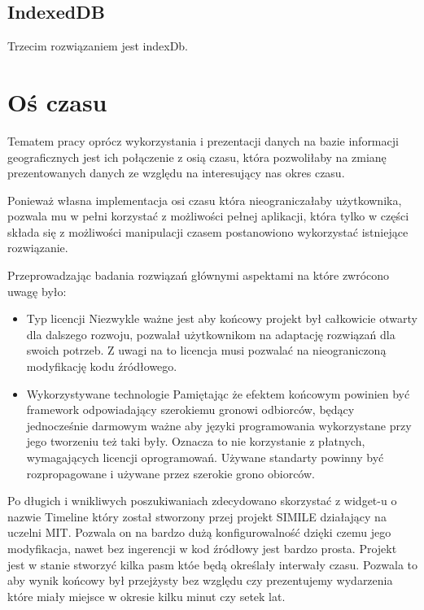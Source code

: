 \subsection{IndexedDB}
\label{subsec:indexDB}

Trzecim rozwiązaniem jest indexDb.

\section{Oś czasu}
\label{sec:timeLine}

Tematem pracy oprócz wykorzystania i prezentacji danych na bazie informacji geograficznych jest ich połączenie z osią czasu, która pozwoliłaby na zmianę prezentowanych danych ze względu na interesujący nas okres czasu.

Ponieważ własna implementacja osi czasu która nieograniczałaby użytkownika, pozwala mu w pełni korzystać z możliwości pełnej aplikacji, która tylko w części składa się z możliwości manipulacji czasem postanowiono wykorzystać istniejące rozwiązanie.

Przeprowadzając badania rozwiązań głównymi aspektami na które zwrócono uwagę było:

\begin{itemize}

\item

Typ licencji
Niezwykle ważne jest aby końcowy projekt był całkowicie otwarty dla dalszego rozwoju, pozwalał użytkownikom na adaptację rozwiązań dla swoich potrzeb. Z uwagi na to licencja musi pozwalać na nieograniczoną modyfikację kodu źródłowego.

\item

Wykorzystywane technologie
Pamiętając że efektem końcowym powinien być framework odpowiadający szerokiemu gronowi odbiorców, będący jednocześnie darmowym ważne aby języki programowania wykorzystane przy jego tworzeniu też taki były. Oznacza to nie korzystanie z płatnych, wymagających licencji oprogramowań. Używane standarty powinny być rozpropagowane i używane przez szerokie grono obiorców.

\end{itemize}

Po długich i wnikliwych poszukiwaniach zdecydowano skorzystać z widget-u o nazwie Timeline który został stworzony przej projekt SIMILE działający na uczelni MIT. Pozwala on na bardzo dużą konfigurowalność dzięki czemu jego modyfikacja, nawet bez ingerencji w kod źródłowy jest bardzo prosta.
Projekt jest w stanie stworzyć kilka pasm któe będą określały interwały czasu. Pozwala to aby wynik końcowy był przejżysty bez względu czy prezentujemy wydarzenia które miały miejsce w okresie kilku minut czy setek lat.

